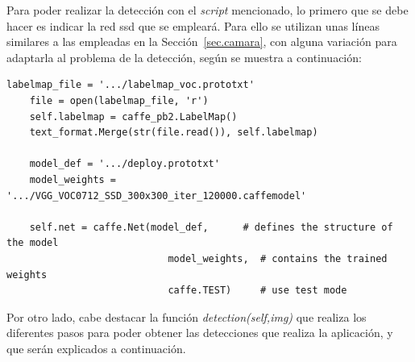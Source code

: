 Para poder realizar la detección con el \textit{script} mencionado, lo primero que se debe hacer es indicar la red \acrshort{ssd} que se empleará. Para ello se utilizan unas líneas similares a las empleadas en la Sección~\ref{sec.camara}, con alguna variación para adaptarla al problema de la detección, según se muestra a continuación:
\vspace{10pt}
\begin{lstlisting}[frame=single]
	labelmap_file = '.../labelmap_voc.prototxt'
	file = open(labelmap_file, 'r')
	self.labelmap = caffe_pb2.LabelMap()
	text_format.Merge(str(file.read()), self.labelmap)
	
	model_def = '.../deploy.prototxt'
	model_weights = '.../VGG_VOC0712_SSD_300x300_iter_120000.caffemodel'
	
	self.net = caffe.Net(model_def,      # defines the structure of the model
							model_weights,  # contains the trained weights
							caffe.TEST)     # use test mode 
\end{lstlisting}



Por otro lado, cabe destacar la función \textit{detection(self,img)} que realiza los diferentes pasos para poder obtener las detecciones que realiza la aplicación, y que serán explicados a continuación.

